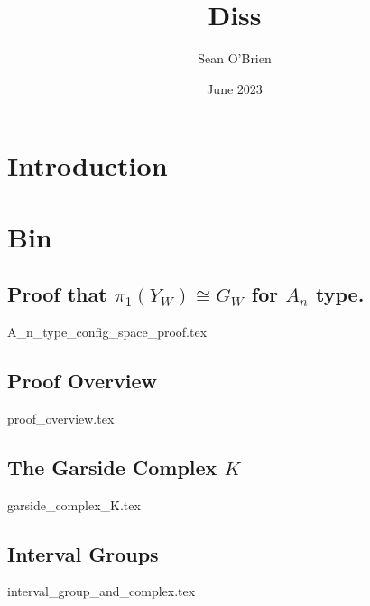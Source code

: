 \documentclass{article}
\title{Diss}
\author{Sean O'Brien}
\date{June 2023}
\begin{document}
\maketitle

\section{Introduction}

\section{Bin}

\subsection{Proof that $\pi_1(Y_W) \cong G_W$ for $A_n$ type. }
{A_n_type_config_space_proof.tex}


\subsection{Proof Overview}
{proof_overview.tex}

\subsection{The Garside Complex $K$}
{garside_complex_K.tex}
\subsection{Interval Groups}
{interval_group_and_complex.tex}


\printbibliography
\end{document}
